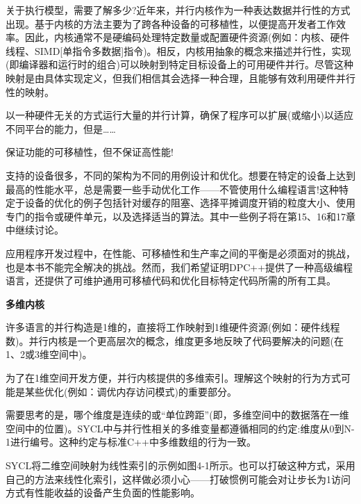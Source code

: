 关于执行模型，需要了解多少?近年来，并行内核作为一种表达数据并行性的方式出现。基于内核的方法主要为了跨各种设备的可移植性，以便提高开发者工作效率。因此，内核通常不是硬编码处理特定数量或配置硬件资源(例如：内核、硬件线程、SIMD[单指令多数据]指令)。相反，内核用抽象的概念来描述并行性，实现(即编译器和运行时的组合)可以映射到特定目标设备上的可用硬件并行。尽管这种映射是由具体实现定义，但我们相信其会选择一种合理，且能够有效利用硬件并行性的映射。\par

以一种硬件无关的方式运行大量的并行计算，确保了程序可以扩展(或缩小)以适应不同平台的能力，但是……\par

\begin{tcolorbox}[colback=red!5!white,colframe=red!75!black]
保证功能的可移植性，但不保证高性能!
\end{tcolorbox}

支持的设备很多，不同的架构为不同的用例设计和优化。想要在特定的设备上达到最高的性能水平，总是需要一些手动优化工作——不管使用什么编程语言!这种特定于设备的优化的例子包括针对缓存的阻塞、选择平摊调度开销的粒度大小、使用专门的指令或硬件单元，以及选择适当的算法。其中一些例子将在第15、16和17章中继续讨论。\par

应用程序开发过程中，在性能、可移植性和生产率之间的平衡是必须面对的挑战，也是本书不能完全解决的挑战。然而，我们希望证明DPC++提供了一种高级编程语言，还提供了可维护通用可移植代码和优化目标特定代码所需的所有工具。\par

\hspace*{\fill} \par %
\textbf{多维内核}

许多语言的并行构造是1维的，直接将工作映射到1维硬件资源(例如：硬件线程数)。并行内核是一个更高层次的概念，维度更多地反映了代码要解决的问题(在1、2或3维空间中)。\par

为了在1维空间开发方便，并行内核提供的多维索引。理解这个映射的行为方式可能是某些优化(例如：调优内存访问模式)的重要部分。\par

需要思考的是，哪个维度是连续的或“单位跨距”(即，多维空间中的数据落在一维空间中的位置)。SYCL中与并行性相关的多维变量都遵循相同的约定:维度从0到N-1进行编号。这种约定与标准C++中多维数组的行为一致。\par

SYCL将二维空间映射为线性索引的示例如图4-1所示。也可以打破这种方式，采用自己的方法来线性化索引，这样做必须小心——打破惯例可能会对让步长为1访问方式有性能收益的设备产生负面的性能影响。\par

